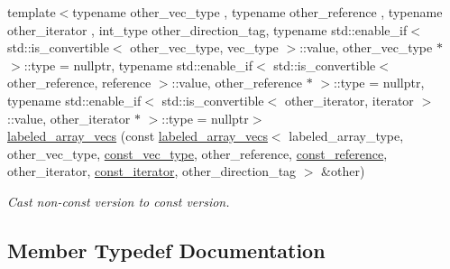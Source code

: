 \begin{DoxyCompactItemize}
{\footnotesize template$<$typename other\+\_\+vec\+\_\+type , typename other\+\_\+reference , typename other\+\_\+iterator , int\+\_\+type other\+\_\+direction\+\_\+tag, typename std\+::enable\+\_\+if$<$ std\+::is\+\_\+convertible$<$ other\+\_\+vec\+\_\+type, vec\+\_\+type $>$\+::value, other\+\_\+vec\+\_\+type $\ast$ $>$\+::type  = nullptr, typename std\+::enable\+\_\+if$<$ std\+::is\+\_\+convertible$<$ other\+\_\+reference, reference $>$\+::value, other\+\_\+reference $\ast$ $>$\+::type  = nullptr, typename std\+::enable\+\_\+if$<$ std\+::is\+\_\+convertible$<$ other\+\_\+iterator, iterator $>$\+::value, other\+\_\+iterator $\ast$ $>$\+::type  = nullptr$>$ }\\\hyperlink{classIceBRG_1_1labeled__array__vecs_a7def03289ea8410a14142a73fa3aa62e}{labeled\+\_\+array\+\_\+vecs} (const \hyperlink{classIceBRG_1_1labeled__array__vecs}{labeled\+\_\+array\+\_\+vecs}$<$ labeled\+\_\+array\+\_\+type, other\+\_\+vec\+\_\+type, \hyperlink{classIceBRG_1_1labeled__array__vecs_a02abd04f15383823d790ea596eee00ed}{const\+\_\+vec\+\_\+type}, other\+\_\+reference, \hyperlink{classIceBRG_1_1labeled__array__vecs_a5ab1d23d61a03d4f64756b59f5773d41}{const\+\_\+reference}, other\+\_\+iterator, \hyperlink{classIceBRG_1_1labeled__array__vecs_a6003abed56d6f931ce74524cda329972}{const\+\_\+iterator}, other\+\_\+direction\+\_\+tag $>$ \&other)
\begin{DoxyCompactList}\small\item\em Cast non-\/const version to const version. \end{DoxyCompactList}\end{DoxyCompactItemize}


\subsection{Member Typedef Documentation}
\hypertarget{classIceBRG_1_1labeled__array__vecs_a6003abed56d6f931ce74524cda329972}{}
